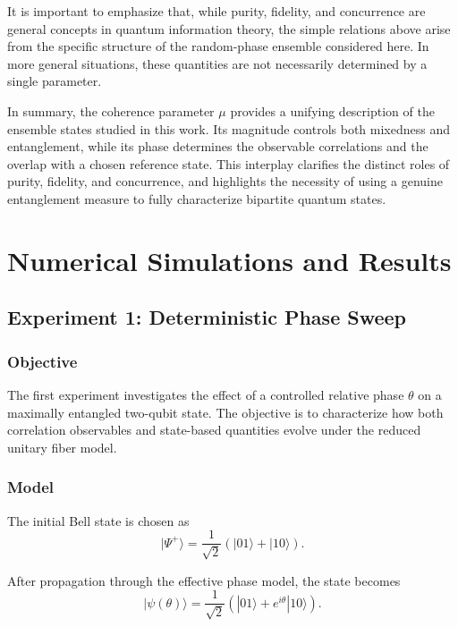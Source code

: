 \documentclass[a4paper]{article}
\begin{document}
It is important to emphasize that, while purity, fidelity, and concurrence are general concepts in quantum information theory, the simple relations above arise from the specific structure of the random-phase ensemble considered here. In more general situations, these quantities are not necessarily determined by a single parameter.

\medskip

In summary, the coherence parameter \(\mu\) provides a unifying description of the ensemble states studied in this work. Its magnitude controls both mixedness and entanglement, while its phase determines the observable correlations and the overlap with a chosen reference state. This interplay clarifies the distinct roles of purity, fidelity, and concurrence, and highlights the necessity of using a genuine entanglement measure to fully characterize bipartite quantum states.

\section{Numerical Simulations and Results}

\subsection{Experiment 1: Deterministic Phase Sweep}

\subsubsection{Objective}

The first experiment investigates the effect of a controlled relative phase \(\theta\) on a maximally entangled two-qubit state. The objective is to characterize how both correlation observables and state-based quantities evolve under the reduced unitary fiber model.

\subsubsection{Model}

The initial Bell state is chosen as
\[
|\Psi^{+}\rangle
=
\frac{1}{\sqrt{2}}
\left(
|01\rangle + |10\rangle
\right).
\]

After propagation through the effective phase model, the state becomes
\[
|\psi(\theta)\rangle
=
\frac{1}{\sqrt{2}}
\left(
|01\rangle + e^{i\theta}|10\rangle
\right).
\]
\end{document}
